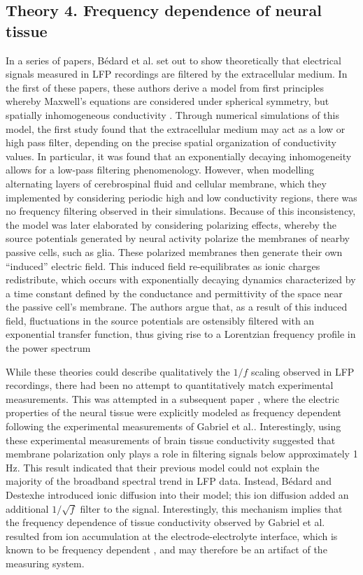 \subsection{Theory 4. Frequency dependence of neural tissue} \label{sec:filter_theory}
In a series of papers, Bédard et al.\cite{Bedard2004,Bedard2006a,Bedard2009} set out to show theoretically that electrical signals measured in LFP recordings are filtered by the extracellular medium. In the first of these papers, these authors derive a model from first principles whereby Maxwell’s equations are considered under spherical symmetry, but spatially inhomogeneous conductivity \cite{Bedard2004}. Through numerical simulations of this model, the first study found that the extracellular medium may act as a low or high pass filter, depending on the precise spatial organization of conductivity values. In particular, it was found that an exponentially decaying inhomogeneity allows for a low-pass filtering phenomenology. However, when modelling alternating layers of cerebrospinal fluid and cellular membrane, which they implemented by considering periodic high and low conductivity regions, there was no frequency filtering observed in their simulations. Because of this inconsistency, the model was later elaborated \cite{Bedard2006a} by considering polarizing effects, whereby the source potentials generated by neural activity polarize the membranes of nearby passive cells, such as glia. These polarized membranes then generate their own ``induced'' electric field. This induced field re-equilibrates as ionic charges redistribute, which occurs with exponentially decaying dynamics characterized by a time constant defined by the conductance and permittivity of the space near the passive cell's membrane. The authors argue that, as a result of this induced field, fluctuations in the source potentials are ostensibly filtered with an exponential transfer function, thus giving rise to a Lorentzian frequency profile in the power spectrum

While these theories could describe qualitatively the $1/f$ scaling observed in LFP recordings, there had been no attempt to quantitatively match experimental measurements. This was attempted in a subsequent paper \cite{Bedard2009}, where the electric properties of the neural tissue were explicitly modeled as frequency dependent following the experimental measurements of Gabriel et al.\cite{Gabriel1996}. Interestingly, using these experimental measurements of brain tissue conductivity suggested that membrane polarization only plays a role in filtering signals below approximately 1 Hz. This result indicated that their previous model \cite{Bedard2006a} could not explain the majority of the broadband spectral trend in LFP data. Instead, Bédard and Destexhe\cite{Bedard2006a} introduced ionic diffusion into their model; this ion diffusion added an additional $1/\sqrt{f}$ filter to the signal. Interestingly, this mechanism implies that the frequency dependence of tissue conductivity observed by Gabriel et al.\cite{Gabriel1996} resulted from ion accumulation at the electrode-electrolyte interface, which is known to be frequency dependent \cite{Warburg1899}, and may therefore be an artifact of the measuring system.

